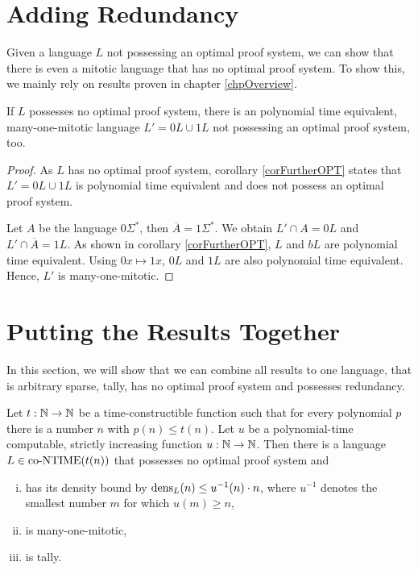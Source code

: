   \section{Adding Redundancy}

  Given a language \(L\) not possessing an optimal proof system, we can show that there is even a mitotic language that has no optimal proof system. To show this, we mainly rely on results proven in chapter \ref{chpOverview}.

  \begin{theorem} \label{thmMitotic}
    If \(L\) possesses no optimal proof system, there is an polynomial time equivalent, many-one-mitotic language \(L' = 0L \cup 1L\) not possessing an optimal proof system, too.
  \end{theorem}

  \begin{proof}
    As \(L\) has no optimal proof system, corollary \ref{corFurtherOPT} states that \(L' = 0L \cup 1L\) is polynomial time equivalent and does not possess an optimal proof system.

    Let \(A\) be the language \(0\Sigma^*\), then \(\overline{A} = 1\Sigma^*\). We obtain \(L' \cap A = 0L\) and \(L' \cap \overline{A} = 1L\). As shown in corollary \ref{corFurtherOPT}, \(L\) and \(bL\) are polynomial time equivalent. Using \(0x \mapsto 1x\), \(0L\) and \(1L\) are also polynomial time equivalent. Hence, \(L'\) is many-one-mitotic.
  \end{proof}
  
  
  \section{Putting the Results Together}
  
  In this section, we will show that we can combine all results to one language, that is arbitrary sparse, tally, has no optimal proof system and possesses redundancy.
  
  \begin{corollary}
    Let \(t:\mathbb{N}\to\mathbb{N}\) be a time-constructible function such that for every polynomial \(p\) there is a number \(n\) with \(p(n) \leq t(n)\). Let \(u\) be a polynomial-time computable, strictly increasing function \(u:\mathbb{N}\to\mathbb{N}\). Then there is a language \(L \in \text{co-NTIME}(t(n))\) that possesses no optimal proof system and 
    \begin{enumerate}[(i)]
     \item has its density bound by \(\operatorname{dens}_L(n) \leq u^{-1}(n) \cdot n\), where \(u^{-1}\) denotes the smallest number \(m\) for which \(u(m) \geq n\),
     \item is many-one-mitotic,
     \item is tally.
    \end{enumerate}
  \end{corollary}
  
